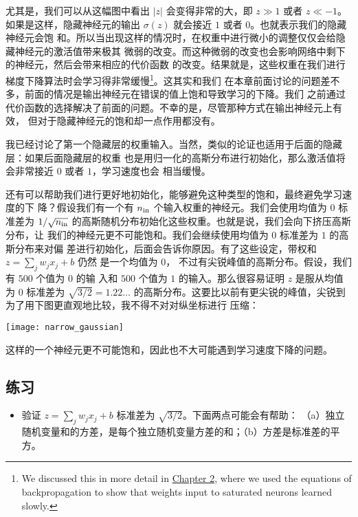 尤其是，我们可以从这幅图中看出 $|z|$ 会变得非常的大，即 $z \gg 1$ 或者 $z \ll -1$。如果是这样，隐藏神经元的输出 $\sigma(z)$ 就会接近 $1$ 或者 $0$。也就表示我们的隐藏神经元会饱
和。所以当出现这样的情况时，在权重中进行微小的调整仅仅会给隐藏神经元的激活值带来极其
微弱的改变。而这种微弱的改变也会影响网络中剩下的神经元，然后会带来相应的代价函数
的改变。结果就是，这些权重在我们进行梯度下降算法时会学习得非常缓慢\footnote{We discussed this in more detail in \hyperref[sec:the_four_fundamental_equations_behind_backpropagation]{Chapter 2}, where we used the equations of backpropagation to show that weights input to saturated neurons learned slowly.}。这其实和我们
在本章前面讨论的问题差不多，前面的情况是输出神经元在错误的值上饱和导致学习的下降。我们
之前通过代价函数的选择解决了前面的问题。不幸的是，尽管那种方式在输出神经元上有效，
但对于隐藏神经元的饱和却一点作用都没有。

我已经讨论了第一个隐藏层的权重输入。当然，类似的论证也适用于后面的隐藏层：如果后面隐藏层的权重
也是用归一化的高斯分布进行初始化，那么激活值将会非常接近 $0$ 或者 $1$，学习速度也会
相当缓慢。

还有可以帮助我们进行更好地初始化，能够避免这种类型的饱和，最终避免学习速度的下
降？假设我们有一个有 $n_{\rm in}$ 个输入权重的神经元。我们会使用均值为 $0$ 标准差为
$1/\sqrt{n_{\rm in}}$ 的高斯随机分布初始化这些权重。也就是说，我们会向下挤压高斯分布，让
我们的神经元更不可能饱和。我们会继续使用均值为 $0$ 标准差为 $1$ 的高斯分布来对偏
差进行初始化，后面会告诉你原因。有了这些设定，带权和 $z = \sum_j w_j x_j + b$ 仍然
是一个均值为 $0$， 不过有尖锐峰值的高斯分布。假设，我们有 $500$ 个值为 $0$ 的输
入和 $500$ 个值为 $1$ 的输入。那么很容易证明 $z$ 是服从均值为 $0$ 标准差为
$\sqrt{3/2} = 1.22\ldots$ 的高斯分布。这要比以前有更尖锐的峰值，尖锐到为了用下图更直观地比较，我不得不对对纵坐标进行
压缩：
\begin{center}
  \texttt{[image: narrow\_gaussian]}
\end{center}

这样的一个神经元更不可能饱和，因此也不大可能遇到学习速度下降的问题。

\subsection*{练习}

\begin{itemize}
\item 验证 $z = \sum_j w_j x_j + b$ 标准差为 $\sqrt{3/2}$。下面两点可能会有帮助：
  （a）独立随机变量和的方差，是每个独立随机变量方差的和；（b）方差是标准差的平方。
\end{itemize}


